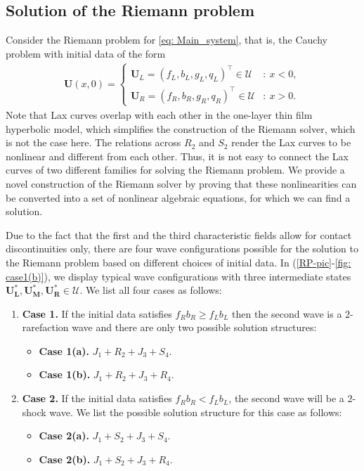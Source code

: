 \documentclass[11pt]{article}
\numberwithin{equation}{section}
\newtheorem{counter example}[theorem]{Counter Example}
\begin{document}
{\subsection{Solution of the Riemann problem}\label{sec: Riemann}
Consider the  Riemann problem for \eqref{eq: Main_system}, that is, the Cauchy problem  with initial data of the form 
\begin{align}
    \mathbf{U} (x, 0)=\begin{cases}
        \mathbf{U}_L=(f_L, b_L, g_L, q_L )^\top\in {\mathcal U}&:~x<0,\\
        \mathbf{U}_R=(f_R, b_R, g_R, q_R)^\top \in {\mathcal U}&:~x>0.
    \end{cases}
\end{align}
Note that Lax curves overlap with each other in the one-layer thin film hyperbolic model, which simplifies the construction of the Riemann solver, which is not the case here. The relations across $R_2$ and $S_2$ render the Lax curves to be nonlinear and different from each other. Thus, it is not easy to connect the Lax curves of two different families for solving the Riemann problem. We provide a novel construction of the Riemann solver by proving that these nonlinearities can be converted into a set of nonlinear algebraic equations, for which we can find a solution.   

Due to the fact that the first and the third characteristic fields allow for contact discontinuities only, there are four wave configurations possible for the solution to the Riemann problem based on different choices of initial data.  In (\ref{RP-pic}-\ref{fig: case1(b)}), we display typical wave configurations with three intermediate states $\mathbf{U_L^*},\mathbf{U_M^*}, \mathbf{U_R^*} \in \mathcal U$. We list all four cases  as follows:
\begin{enumerate}
\item {\textbf{Case 1.}} If the initial data satisfies $f_Rb_R\geq f_Lb_L$ then the second wave is a $2$-rarefaction wave and there are only two possible solution structures:
\begin{itemize} 
    \item {\textbf{Case 1(a).}}  $J_1+R_2+J_3+S_4$.
    \item {\textbf{Case 1(b).}}  $J_1+R_2+J_3+R_4$.
\end{itemize}
\item {\textbf{Case 2.}} If the initial data satisfies $f_Rb_R< f_Lb_L$, the second wave will be a $2$-shock wave. We list the possible solution structure for this case as follows:
\begin{itemize}
    \item {\textbf{Case 2(a).}} $J_1+S_2+J_3+S_4$.
    \item {\textbf{Case 2(b).}} $J_1+S_2+J_3+R_4$.
\end{itemize}
\end{enumerate}
}
\end{document}
